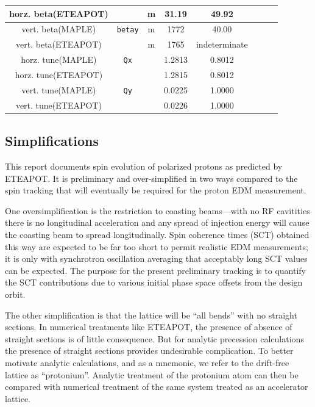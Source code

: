 \documentclass[]{article}
\begin{document}
\begin{table}[h]
\begin{tabular}{|c|c|c|c|c|c|c|c|}
horz. beta(ETEAPOT) &                   &  m   &     31.19             &   49.92             \\ \hline
%
vert. beta(MAPLE)   & {\tt betay}       &  m   &    1772               &   40.00             \\ 
vert. beta(ETEAPOT) &                   &  m   &    1765               & indeterminate       \\ \hline
%
horz. tune(MAPLE)   &  {\tt Qx}         &      &    1.2813             &   0.8012            \\
horz. tune(ETEAPOT) &                   &      &    1.2815             &   0.8012            \\ \hline
%
vert. tune(MAPLE)   &  {\tt Qy}         &      &    0.0225            &   1.0000            \\ 
vert. tune(ETEAPOT) &                   &      &    0.0226            &   1.0000            \\
\hline
\end{tabular}
\end{table}
%

\subsection{Simplifications}
This report documents spin evolution of polarized protons as
predicted by ETEAPOT. It is preliminary and over-simplified
in two ways compared to the spin tracking that will eventually
be required for the proton EDM measurement. 

One oversimplification is the restriction to coasting beams---with 
no RF cavitities there is no longitudinal acceleration and any
spread of injection energy will cause the coasting beam to spread 
longitudinally. Spin coherence times (SCT) obtained this way are
expected to be far too short to permit realistic EDM measurements;
it is only with synchrotron oscillation averaging that 
acceptably long SCT values can be expected. The purpose for the present
preliminary tracking is to quantify the SCT contributions due to various 
initial phase space offsets from the design orbit.

The other simplification is that the lattice will be ``all bends''
with no straight sections. In numerical treatments like ETEAPOT, the
presence of absence of straight sections is of little consequence.
But for analytic precession calculations the presence of straight 
sections provides undesirable complication. To better motivate analytic
calculations, and as a mnemonic, we refer to the drift-free lattice 
as ``protonium''. Analytic treatment of the protonium atom can then 
be compared with numerical treatment of the same system 
treated as an accelerator lattice.
\end{document}
